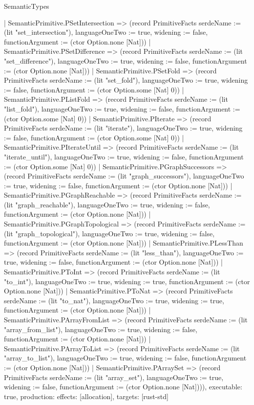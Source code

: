 \begin{lexlean}{SemanticTypes}
\begin{semanticmodule}
{    | SemanticPrimitive.PSetIntersection => (record PrimitiveFacts {serdeName := (lit "set_intersection"), languageOneTwo := true, widening := false, functionArgument := (ctor Option.none [Nat])})
    | SemanticPrimitive.PSetDifference => (record PrimitiveFacts {serdeName := (lit "set_difference"), languageOneTwo := true, widening := false, functionArgument := (ctor Option.none [Nat])})
    | SemanticPrimitive.PSetFold => (record PrimitiveFacts {serdeName := (lit "set_fold"), languageOneTwo := true, widening := false, functionArgument := (ctor Option.some [Nat] 0)})
    | SemanticPrimitive.PListFold => (record PrimitiveFacts {serdeName := (lit "list_fold"), languageOneTwo := true, widening := false, functionArgument := (ctor Option.some [Nat] 0)})
    | SemanticPrimitive.PIterate => (record PrimitiveFacts {serdeName := (lit "iterate"), languageOneTwo := true, widening := false, functionArgument := (ctor Option.some [Nat] 0)})
    | SemanticPrimitive.PIterateUntil => (record PrimitiveFacts {serdeName := (lit "iterate_until"), languageOneTwo := true, widening := false, functionArgument := (ctor Option.some [Nat] 0)})
    | SemanticPrimitive.PGraphSuccessors => (record PrimitiveFacts {serdeName := (lit "graph_successors"), languageOneTwo := true, widening := false, functionArgument := (ctor Option.none [Nat])})
    | SemanticPrimitive.PGraphReachable => (record PrimitiveFacts {serdeName := (lit "graph_reachable"), languageOneTwo := true, widening := false, functionArgument := (ctor Option.none [Nat])})
    | SemanticPrimitive.PGraphTopological => (record PrimitiveFacts {serdeName := (lit "graph_topological"), languageOneTwo := true, widening := false, functionArgument := (ctor Option.none [Nat])})
    | SemanticPrimitive.PLessThan => (record PrimitiveFacts {serdeName := (lit "less_than"), languageOneTwo := true, widening := false, functionArgument := (ctor Option.none [Nat])})
    | SemanticPrimitive.PToInt => (record PrimitiveFacts {serdeName := (lit "to_int"), languageOneTwo := true, widening := true, functionArgument := (ctor Option.none [Nat])})
    | SemanticPrimitive.PToNat => (record PrimitiveFacts {serdeName := (lit "to_nat"), languageOneTwo := true, widening := true, functionArgument := (ctor Option.none [Nat])})
    | SemanticPrimitive.PArrayFromList => (record PrimitiveFacts {serdeName := (lit "array_from_list"), languageOneTwo := true, widening := false, functionArgument := (ctor Option.none [Nat])})
    | SemanticPrimitive.PArrayToList => (record PrimitiveFacts {serdeName := (lit "array_to_list"), languageOneTwo := true, widening := false, functionArgument := (ctor Option.none [Nat])})
    | SemanticPrimitive.PArraySet => (record PrimitiveFacts {serdeName := (lit "array_set"), languageOneTwo := true, widening := false, functionArgument := (ctor Option.none [Nat])})),
  executable: true,
  production: {effects: [allocation], targets: [rust-std]}
}


\end{semanticmodule}
\end{lexlean}
